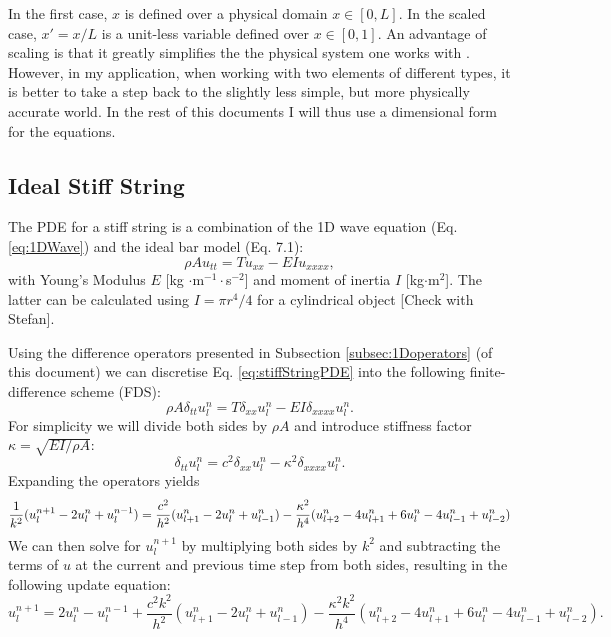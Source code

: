 \documentclass{article}
\begin{document}
In the first case, $x$ is defined over a physical domain $x\in[0,L]$. In the scaled case, $x' = x/L$ is a unit-less variable defined over $x\in[0,1]$. An advantage of scaling is that it greatly simplifies the the physical system one works with \cite{Bilbao2009}. However, in my application, when working with two  elements of different types, it is better to take a step back to the slightly less simple, but more physically accurate world. In the rest of this documents I will thus use a dimensional form for the equations.

\subsection{Ideal Stiff String}
The PDE for a stiff string is a combination of the 1D wave equation (Eq. \eqref{eq:1DWave}) and the ideal bar model (Eq. 7.1):
\begin{equation}\label{eq:stiffStringPDE}
    \rho A u_{tt} = T u_{xx} - EI u_{xxxx},
\end{equation}
with Young's Modulus $E$ [kg $\cdot$m$^{-1} \cdot$s$^{-2}$] and moment of inertia $I$ [kg$\cdot$m$^2$]. The latter can be calculated using $I = \pi r^4/4$ for a cylindrical object [Check with Stefan].

Using the difference operators presented in Subsection \ref{subsec:1Doperators} (of this document) we can discretise Eq. \eqref{eq:stiffStringPDE} into the following finite-difference scheme (FDS):
\begin{equation}\label{eq:stiffStringFDS}
    \rho A \delta_{tt}u_l^n = T \delta_{xx} u_l^n - EI \delta_{xxxx} u_l^n.
\end{equation}
For simplicity we will divide both sides by $\rho A$ and introduce stiffness factor $\kappa = \sqrt{EI/\rho A}$:
\begin{equation}\label{eq:stiffStringFDSVars}
   \delta_{tt}u_l^n = c^2 \delta_{xx} u_l^n - \kappa^2 \delta_{xxxx} u_l^n.
\end{equation}
Expanding the operators yields
\begin{equation}
    \frac{1}{k^2}(u_l^{n+1}-2u_l^n+u_l^{n-1}) = \frac{c^2}{h^2}(u_{l+1}^n-2u_l^n+u_{l-1}^n)- \\
 \frac{\kappa^2}{h^4}(u_{l+2}^n-4u_{l+1}^n+6u_l^n-4u_{l-1}^n+u_{l-2}^n)
\end{equation}
We can then solve for $u_l^{n+1}$ by multiplying both sides by $k^2$ and subtracting the terms of $u$ at the current and previous time step from both sides, resulting in the following update equation:
\begin{equation}
    u_l^{n+1} = 2u_l^n-u_l^{n-1}+\frac{c^2k^2}{h^2}(u_{l+1}^n-2u_l^n+u_{l-1}^n)-\frac{\kappa^2k^2}{h^4}(u_{l+2}^n-4u_{l+1}^n+6u_l^n-4u_{l-1}^n+u_{l-2}^n).
\end{equation}
\end{document}
